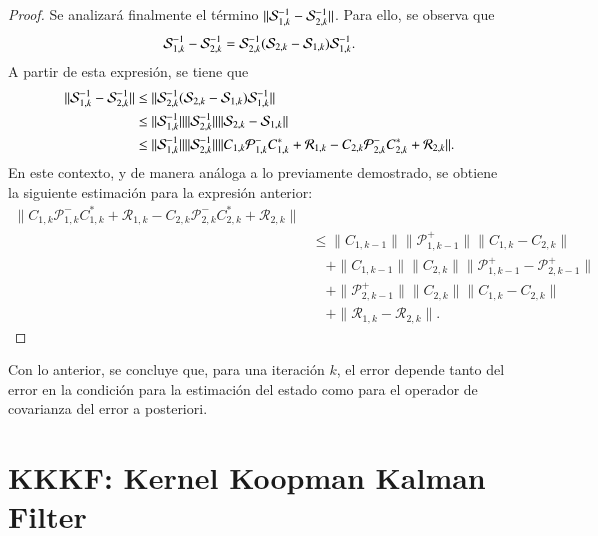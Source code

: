 \begin{proof}
Se analizará finalmente el término $\| \S_{1,k}^{-1} -  \S_{2,k}^{-1}\|$. Para ello, se observa que
\begin{equation*}
	\S_{1,k}^{-1} -  \S_{2,k}^{-1} = \S_{2,k}^{-1} (\S_{2,k} - \S_{1,k}) \S_{1,k}^{-1}.
\end{equation*}
A partir de esta expresión, se tiene que
\begin{equation*}
	\begin{aligned}
		\| \S_{1,k}^{-1} -  \S_{2,k}^{-1} \| & \leq  \| \S_{2,k}^{-1} (\S_{2,k} - \S_{1,k}) \S_{1,k}^{-1} \| \\
		& \leq \| \S_{1,k}^{-1} \| \|  \S_{2,k}^{-1} \| \| \S_{2,k} - \S_{1,k}\| \\
		& \leq  \| \S_{1,k}^{-1} \| \|  \S_{2,k}^{-1} \|  \| C_{1,k} \mathcal{P}_{1,k}^- C_{1,k}^* + \mathcal{R}_{1,k} - C_{2,k} \mathcal{P}_{2,k}^- C_{2,k}^* + \mathcal{R}_{2,k} \|.
	\end{aligned}
\end{equation*}
En este contexto, y de manera análoga a lo previamente demostrado, se obtiene la siguiente estimación para la expresión anterior:
\begin{equation*}
	\begin{aligned}
		\| C_{1,k} \mathcal{P}_{1,k}^- C_{1,k}^* + \mathcal{R}_{1,k} - C_{2,k} \mathcal{P}_{2,k}^- C_{2,k}^* + \mathcal{R}_{2,k} \| \\
		& \leq \|C_{1,k-1} \|  \| \mathcal{P}_{1,k-1}^+ \| \|  C_{1,k} - C_{2,k} \|  \\
            & \quad + \|C_{1,k-1} \|  \| C_{2,k} \| \| \mathcal{P}_{1,k-1}^+  - \mathcal{P}_{2,k-1}^+  \| \\
		& \quad + \| \mathcal{P}_{2,k-1}^+ \| \| C_{2,k}  \| \|C_{1,k} - C_{2,k} \| \\
		& \quad+ \| \mathcal{R}_{1,k} - \mathcal{R}_{2,k}  \|.
	\end{aligned}
\end{equation*}

\end{proof}

Con lo anterior, se concluye que, para una iteración $k$, el error depende tanto del error en la condición para la estimación del estado como para el operador de covarianza del error a posteriori.

\section{KKKF: Kernel Koopman Kalman Filter}

